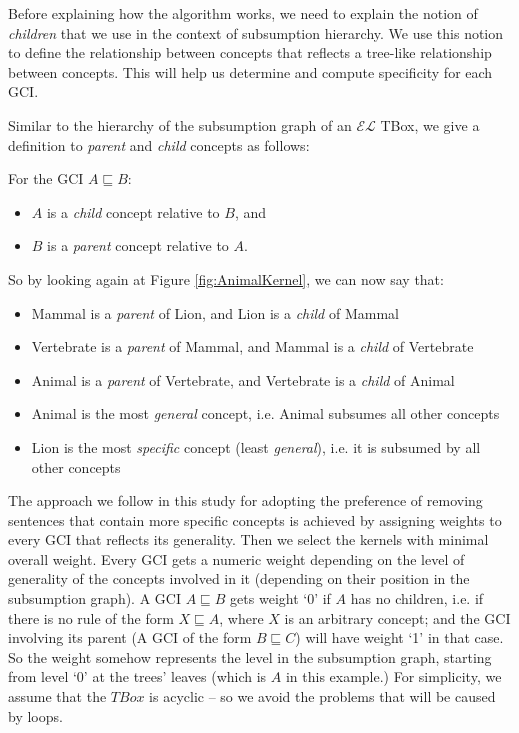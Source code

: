 Before explaining how the algorithm works, we need to explain the notion of \textit{children} that we use in the context of subsumption hierarchy. We use this notion to define the relationship between concepts that reflects a tree-like relationship between concepts. This will help us determine and compute specificity for each GCI.

Similar to the hierarchy of the subsumption graph of an $\mathcal{EL}$ TBox, we give a definition to \textit{parent} and \textit{child} concepts as follows:
\begin{defn}
\label{defn:Parent-Child}
For the GCI $A \sqsubseteq B$:
\begin{itemize}
\item $A$ is a \textit{child} concept relative to $B$, and
\item $B$ is a \textit{parent} concept relative to $A$.\\
\end{itemize}
\end{defn}

So by looking again at Figure \ref{fig:AnimalKernel}, we can now say that:
\begin{itemize}
\item Mammal is a \textit{parent} of Lion, and Lion is a \textit{child} of Mammal
\item Vertebrate is a \textit{parent} of Mammal, and Mammal is a \textit{child} of Vertebrate
\item Animal is a \textit{parent} of Vertebrate, and Vertebrate is a \textit{child} of Animal
\item Animal is the most \textit{general} concept, i.e. Animal subsumes all other concepts
\item Lion is the most \textit{specific} concept (least \textit{general}), i.e. it is subsumed by all other concepts
\end{itemize}

The approach we follow in this study for adopting the preference of removing sentences that contain more specific concepts is achieved by assigning weights to every GCI that reflects its generality. Then we select the kernels with minimal overall weight. Every GCI gets a numeric weight depending on the level of generality of the concepts involved in it (depending on their position in the subsumption graph). A GCI $A \sqsubseteq B$ gets weight `0' if $A$ has no children, i.e. if there is no rule of the form $X \sqsubseteq A$, where $X$ is an arbitrary concept; and the GCI involving its parent (A GCI of the form $B \sqsubseteq C$) will have weight `1' in that case. So the weight somehow represents the level in the subsumption graph, starting from level `0' at the trees' leaves (which is $A$ in this example.) For simplicity, we assume that the $TBox$ is acyclic -- so we avoid the problems that will be caused by loops.

